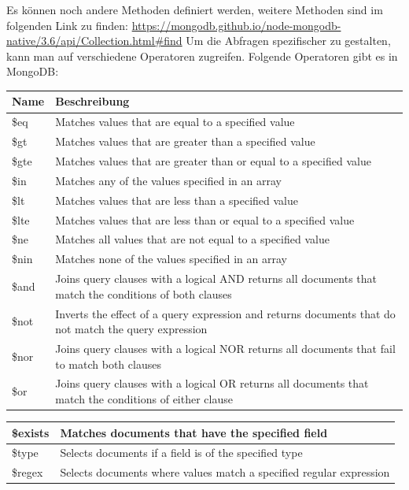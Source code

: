 \cite{mongodb_query_methods}
\newline
Es können noch andere Methoden definiert werden, weitere Methoden sind im folgenden Link zu finden:
\newline
\url{https://mongodb.github.io/node-mongodb-native/3.6/api/Collection.html#find}
\newline
Um die Abfragen spezifischer zu gestalten, kann man auf verschiedene Operatoren zugreifen. Folgende Operatoren gibt es in MongoDB:
\begin{center}
    \begin{tabular}{ | m{1.5cm} | m{13cm} | } 
        \hline
        Name & Beschreibung \\ [0.5ex] 
        \hline\hline
        \$eq & Matches values that are equal to a specified value \\
        \hline
        \$gt & Matches values that are greater than a specified value \\
        \hline
        \$gte & Matches values that are greater than or equal to a specified value \\
        \hline
        \$in & Matches any of the values specified in an array \\
        \hline
        \$lt & Matches values that are less than a specified value \\
        \hline
        \$lte & Matches values that are less than or equal to a specified value \\
        \hline
        \$ne & Matches all values that are not equal to a specified value \\
        \hline
        \$nin & Matches none of the values specified in an array \\
        \hline
        \$and & Joins query clauses with a logical AND returns all documents that match the conditions of both clauses \\
        \hline
        \$not & Inverts the effect of a query expression and returns documents that do not match the query expression \\
        \hline
        \$nor & Joins query clauses with a logical NOR returns all documents that fail to match both clauses \\
        \hline
        \$or & Joins query clauses with a logical OR returns all documents that match the conditions of either clause \\
    \end{tabular}
\end{center}
\begin{center}
    \begin{tabular}{ | m{1.5cm} | m{13cm} | } 
        \$exists & Matches documents that have the specified field \\
        \hline
        \$type & Selects documents if a field is of the specified type \\
        \hline
        \$regex & Selects documents where values match a specified regular expression \\
        \hline
    \end{tabular}
\end{center}
